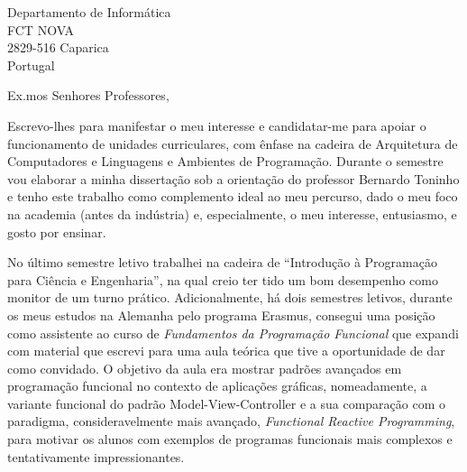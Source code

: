 \documentclass[11pt]{letter} %
\begin{document}

\begin{letter}{Departamento de Informática\\
FCT NOVA\\
2829-516 Caparica\\
Portugal} 


\signature{Rodrigo Mesquita} %


\opening{Ex.mos Senhores Professores,} 
 
Escrevo-lhes para manifestar o meu interesse e candidatar-me para apoiar o
    funcionamento de unidades curriculares, com ênfase na cadeira de Arquitetura
    de Computadores e Linguagens e Ambientes de Programação. Durante o semestre
    vou elaborar a minha dissertação sob a orientação do professor Bernardo
    Toninho e tenho este trabalho como complemento ideal ao meu percurso, dado o
    meu foco na academia (antes da indústria) e, especialmente, o meu interesse,
    entusiasmo, e gosto por ensinar.

No último semestre letivo trabalhei na cadeira de ``Introdução à Programação
    para Ciência e Engenharia'', na qual creio ter tido um bom desempenho como
    monitor de um turno prático. Adicionalmente, há dois semestres letivos,
    durante os meus estudos na Alemanha pelo programa Erasmus, consegui uma
    posição como assistente ao curso de \emph{Fundamentos da Programação
    Funcional} que expandi com material que escrevi para uma aula teórica que
    tive a oportunidade de dar como convidado. O objetivo da aula era mostrar
    padrões avançados em programação funcional no contexto de aplicações
    gráficas, nomeadamente, a variante funcional do padrão Model-View-Controller
    e a sua comparação com o paradigma, consideravelmente mais avançado,
    \emph{Functional Reactive Programming}, para motivar os alunos com exemplos
    de programas funcionais mais complexos e tentativamente impressionantes.




\end{letter}
\end{document}

